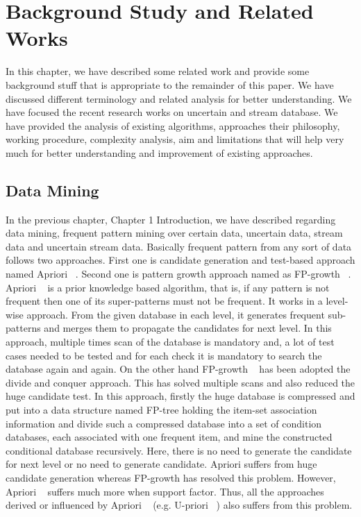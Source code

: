 %
\chapter{Background Study and Related Works}
In this chapter, we have described some related work and provide some background stuff that is appropriate to the remainder of this paper. We have discussed different terminology and related analysis for better understanding. We have focused the recent research works on uncertain and stream database. We have provided the analysis of existing algorithms, approaches their philosophy, working procedure, complexity analysis, aim and limitations that will help very much for better understanding and improvement of existing approaches.

\section{Data Mining}
In the previous chapter, Chapter 1 Introduction, we have described regarding data mining, frequent pattern mining over certain data, uncertain data, stream data and uncertain stream data. Basically frequent pattern from any sort of data follows two approaches. First one is candidate generation and test-based approach named Apriori ~\cite{apriori}. Second one is pattern growth approach named as FP-growth ~\cite{fp_growth}. Apriori ~\cite{apriori} is a prior knowledge based algorithm, that is, if any pattern is not frequent then one of its super-patterns must not be frequent. It works in a level-wise approach. From the given database in each level, it generates frequent sub-patterns and merges them to propagate the candidates for next level. In this approach, multiple times scan of the database is mandatory and, a lot of test cases needed to be tested and for each check it is mandatory to search the database again and again. On the other hand FP-growth ~\cite{fp_growth} has been adopted the divide and conquer approach. This has solved multiple scans and also reduced the huge candidate test. In this approach, firstly the huge database is compressed and put into a data structure named FP-tree holding the item-set association information and divide such a compressed database into a set of condition databases, each associated with one frequent item, and mine the constructed conditional database recursively. Here, there is no need to generate the candidate for next level or no need to generate candidate. Apriori suffers from huge candidate generation whereas FP-growth has resolved this problem. However, Apriori ~\cite{apriori} suffers much more when support factor. Thus, all the approaches derived or influenced by Apriori ~\cite{apriori} (e.g. U-priori ~\cite{u_priori}) also suffers from this problem.

